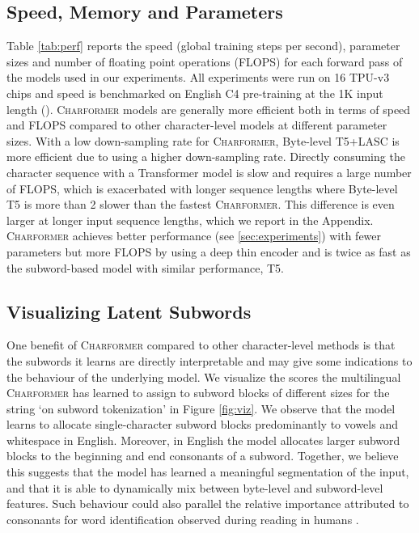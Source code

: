 \documentclass{article} \usepackage{iclr2022_conference,times}
\newcommand{\charformer}{\textsc{Charformer}\xspace}
\newcommand{\charformertall}{\textsc{Charformer}\xspace}
\newcommand{\byte}{Byte-level T5\xspace}
\newcommand{\canine}{Byte-level T5+LASC\xspace}
\begin{document}
\subsection{Speed, Memory and Parameters} \label{sec:speed}
Table \ref{tab:perf} reports the speed (global training steps per second), parameter sizes and number of floating point operations (FLOPS) for each forward pass of the models used in our experiments. All experiments were run on 16 TPU-v3 chips and speed is benchmarked on English C4 pre-training at the 1K input length (). \charformer models are generally more efficient both in terms of speed and FLOPS compared to other character-level models at different parameter sizes. With a low down-sampling rate  for \charformer, \canine is more efficient due to using a higher down-sampling rate. Directly consuming the character sequence with a Transformer model is slow and requires a large number of FLOPS, which is exacerbated with longer sequence lengths where \byte is more than 2 slower than the fastest \charformer. This difference is even larger at longer input sequence lengths, which we report in the Appendix. \charformertall achieves better performance (see \textsection \ref{sec:experiments}) with fewer parameters but more FLOPS by using a deep thin encoder and is twice as fast as the subword-based model with similar performance, T5.

\subsection{Visualizing Latent Subwords}

One benefit of \charformer compared to other character-level methods is that the subwords it learns are directly interpretable and may give some indications to the behaviour of the underlying model. We visualize the scores the multilingual \charformer has learned to assign to subword blocks of different sizes for the string `on subword tokenization' in Figure \ref{fig:viz}. We observe that the model learns to allocate single-character subword blocks predominantly to vowels and whitespace in English. Moreover, in English the model allocates larger subword blocks to the beginning and end consonants of a subword. Together, we believe this suggests that the model has learned a meaningful segmentation of the input, and that it is able to dynamically mix between byte-level and subword-level features. Such behaviour could also parallel the relative importance attributed to consonants for word identification observed during reading in humans \citep{lee2001relative,carreiras2008vowels}.
\end{document}
